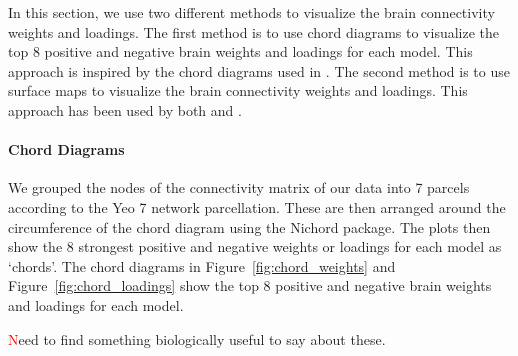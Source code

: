In this section, we use two different methods to visualize the brain connectivity weights and loadings.
The first method is to use chord diagrams to visualize the top 8 positive and negative brain weights and loadings for each model.
This approach is inspired by the chord diagrams used in \cite{smith2015positive}.
The second method is to use surface maps to visualize the brain connectivity weights and loadings.
This approach has been used by both \cite{ferreira2022hierarchical} and \cite{smith2015positive}.

\paragraph{Chord Diagrams}
We grouped the nodes of the connectivity matrix of our data into 7 parcels according to the Yeo 7 network parcellation\cite{yeo2011organization}.
These are then arranged around the circumference of the chord diagram using the Nichord package\cite{bogdan2023connsearch}.
The plots then show the 8 strongest positive and negative weights or loadings for each model as `chords'.
The chord diagrams in Figure~\ref{fig:chord_weights} and Figure~\ref{fig:chord_loadings} show the top 8 positive and negative brain weights and loadings for each model.

\textcolor{red} Need to find something biologically useful to say about these.

